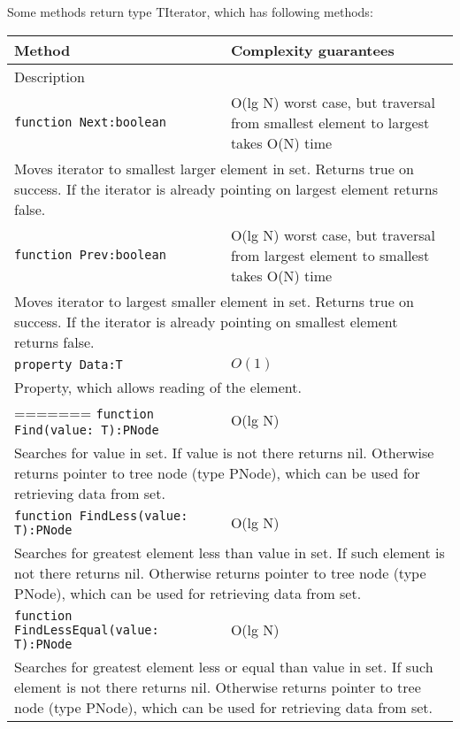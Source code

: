 Some methods return type TIterator, which has following methods:
\begin{longtable}{|m{10cm}|m{5cm}|}                                                             
\hline
Method & Complexity guarantees \\ \hline                                                  
\multicolumn{2}{|m{15cm}|}{Description} \\ \hline\hline                                               
\verb!function Next:boolean! & O(lg N) worst case, but traversal from smallest element to
largest takes O(N) time \\\hline
\multicolumn{2}{|m{15cm}|}{Moves iterator to smallest larger element in set. Returns true on
success. If the iterator is already pointing on largest element returns false.} \\\hline\hline

\verb!function Prev:boolean! & O(lg N) worst case, but traversal from largest element to
smallest takes O(N) time \\\hline
\multicolumn{2}{|m{15cm}|}{Moves iterator to largest smaller element in set. Returns true on
success. If the iterator is already pointing on smallest element returns false.} \\\hline\hline

\verb!property Data:T! & $O(1)$ \\\hline
\multicolumn{2}{|m{15cm}|}{Property, which allows reading of the element.} \\\hline
=======
\verb!function Find(value: T):PNode! & O(lg N) \\\hline
\multicolumn{2}{|m{15cm}|}{Searches for value in set. If value is not there returns nil. Otherwise
returns pointer to tree node (type PNode), which can be used for retrieving data from set.} \\\hline\hline

\verb!function FindLess(value: T):PNode! & O(lg N) \\\hline
\multicolumn{2}{|m{15cm}|}{Searches for greatest element less than value in set. If such element is not there returns nil. Otherwise
returns pointer to tree node (type PNode), which can be used for retrieving data from set.} \\\hline\hline

\verb!function FindLessEqual(value: T):PNode! & O(lg N) \\\hline
\multicolumn{2}{|m{15cm}|}{Searches for greatest element less or equal than value in set. If such element is not there returns nil. Otherwise
returns pointer to tree node (type PNode), which can be used for retrieving data from set.} \\\hline\hline


\end{longtable}
